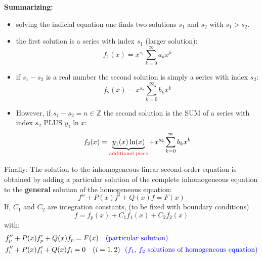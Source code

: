 \documentclass{article}
\begin{document}
\vspace{2mm}\noindent
\textbf{Summarizing:}
\begin{itemize}
    \item solving the indicial equation one finds two solutions $s_1$ and $s_2$ with $s_1>s_2$.
    \item the first solution is a series with index $s_1$ (larger solution):
    \begin{equation}
        f_1(x) = x^{s_1} \sum_{k=0}^{\infty} a_k x^k
    \end{equation}
    \item if $s_1-s_2$ is a real number the second solution is simply a series with index $s_2$:
    \begin{equation}
        f_2(x) = x^{s_2} \sum_{k=0}^{\infty} b_k x^k
    \end{equation}
    \item However, if $s_1-s_2=n\in \mathbb{Z}$ the second solution is the SUM of a series with index $s_2$ PLUS $y_1 \ln{x}$:
    \begin{equation}
        f_2(x) = \underbrace{y_1(x) \ln(x)}_{\color{red}{\text{additional piece}}} + x^{s_2} \sum_{k=0}^{\infty} b_k x^k
    \end{equation}
\end{itemize}
\noindent
Finally:
The solution to the inhomogeneous linear second-order equation is obtained by adding a particular solution of the complete inhomogeneous equation to the \textbf{general} solution of the homogeneous equation:
\begin{equation}
    f'' + P(x) f' + Q(x) f = F(x)
\end{equation}
\color{red} If, $C_1$ and $C_2$ are integration constants, (to be fixed with boundary conditions)
\color{black}
\begin{equation}
    f = f_p(x) + C_1 f_1(x) + C_2 f_2(x)
\end{equation}
\newpage
\noindent
with:
\begin{align}
    & f_p'' + P(x) f_p' + Q(x) f_p = F(x) \quad \color{blue}\text{(particular solution)}\\
    & f_i'' + P(x) f_i' + Q(x) f_i = 0 \quad (i = 1, 2) \ \ \color{blue}\text{($f_1$, $f_2$ solutions of homogeneous equation)}
\end{align}
\end{document}
